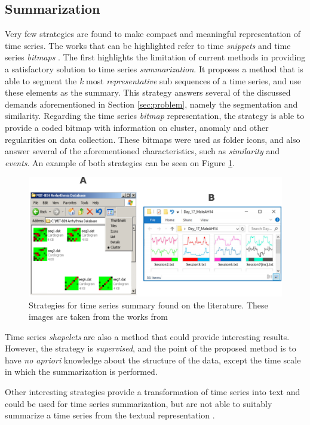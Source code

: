 \subsection{Summarization}

Very few strategies are found to make compact and meaningful representation of time series. The works that can be highlighted refer to time \textit{snippets} and time series \textit{bitmaps} \cite{snippets, bitmap}. The first highlights the limitation of current methods in providing a satisfactory solution to time series \textit{summarization}. It proposes a method that is able to segment the \textit{k} most \textit{representative} sub sequences of a time series, and use these elements as the summary. This strategy answers several of the discussed demands aforementioned in Section \ref{sec:problem}, namely the segmentation and similarity. Regarding the time series \textit{bitmap} representation, the strategy is able to provide a coded bitmap with information on cluster, anomaly and other regularities on data collection. These bitmaps were used as folder icons, and also answer several of the aforementioned characteristics, such as \textit{similarity} and \textit{events}. An example of both strategies can be seen on Figure \ref{fig:keogh_strat}.

\begin{figure}[t]
    \centering
    \includegraphics[width=0.8\linewidth]{Figures/keogh_examples.pdf}
    \caption{Strategies for time series summary found on the literature. These images are taken from the works from \cite{snippets, bitmap}}
    \label{fig:keogh_strat}
\end{figure}

Time series \textit{shapelets} are also a method that could provide interesting results. However, the strategy is \textit{supervised}, and the point of the proposed method is to have \textit{no apriori} knowledge about the structure of the data, except the time scale in which the summarization is performed. 
\par
Other interesting strategies provide a transformation of time series into text and could be used for time series summarization, but are not able to suitably summarize a time series from the textual representation \cite{ssts, sax}.



